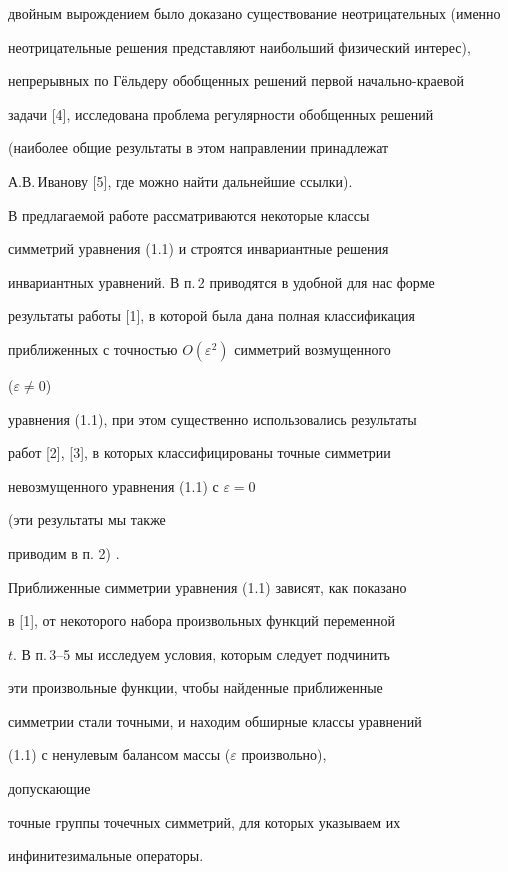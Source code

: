 двойным вырождением было доказано существование неотрицательных (именно


неотрицательные решения представляют наибольший физический интерес),


непрерывных по Г\"ельдеру обобщенных решений первой начально-краевой


задачи [4], исследована проблема регулярности обобщенных решений


(наиболее общие результаты в этом направлении принадлежат


А.В.\,Иванову [5], где можно найти дальнейшие ссылки).





В предлагаемой работе рассматриваются некоторые классы


симметрий уравнения (1.1) и строятся инвариантные решения


инвариантных уравнений. В п.\,2 приводятся в удобной для нас форме


результаты работы [1], в которой была дана полная классификация


приближенных с точностью $O(\varepsilon^2)$ симметрий возмущенного


($\varepsilon\ne 0$)


уравнения (1.1), при этом существенно использовались результаты


работ [2], [3], в которых классифицированы точные симметрии


невозмущенного уравнения (1.1) с $\varepsilon=0$


(эти результаты мы также


приводим в п. 2) .





Приближенные симметрии уравнения (1.1) зависят, как показано


в [1], от некоторого набора произвольных функций переменной


$t$. В п.\,3--5 мы исследуем условия, которым следует подчинить


эти произвольные функции, чтобы найденные приближенные


симметрии стали точными, и находим обширные классы уравнений


(1.1) с ненулевым балансом массы ($\varepsilon$ произвольно),


допускающие


точные группы точечных симметрий, для которых указываем их


инфинитезимальные операторы.





